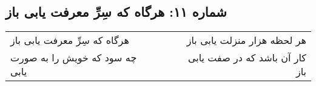 \begin{center}
\section*{شماره ۱۱: هرگاه که سِرِّ معرفت یابی باز}
\label{sec:011}
\begin{longtable}{l p{0.5cm} r}
هرگاه که سِرِّ معرفت یابی باز
&&
هر لحظه هزار منزلت یابی باز
\\
چه سود که خویش را به صورت یابی
&&
کار آن باشد که در صفت یابی باز
\\
\end{longtable}
\end{center}
